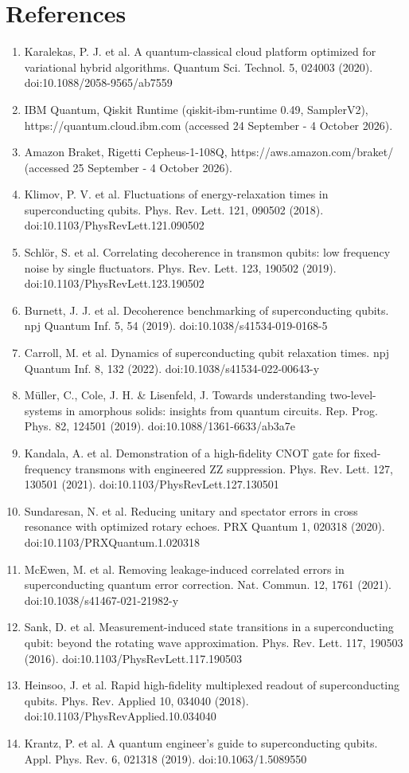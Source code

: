 \documentclass[11pt]{article}
\begin{document}
\section*{References}
\begin{enumerate}
\item Karalekas, P. J. et al. A quantum-classical cloud platform optimized for variational hybrid algorithms. Quantum Sci. Technol. 5, 024003 (2020). doi:10.1088/2058-9565/ab7559
\item IBM Quantum, Qiskit Runtime (qiskit-ibm-runtime 0.49, SamplerV2), https://quantum.cloud.ibm.com (accessed 24 September - 4 October 2026).
\item Amazon Braket, Rigetti Cepheus-1-108Q, https://aws.amazon.com/braket/ (accessed 25 September - 4 October 2026).
\item Klimov, P. V. et al. Fluctuations of energy-relaxation times in superconducting qubits. Phys. Rev. Lett. 121, 090502 (2018). doi:10.1103/PhysRevLett.121.090502
\item Schl\"or, S. et al. Correlating decoherence in transmon qubits: low frequency noise by single fluctuators. Phys. Rev. Lett. 123, 190502 (2019). doi:10.1103/PhysRevLett.123.190502
\item Burnett, J. J. et al. Decoherence benchmarking of superconducting qubits. npj Quantum Inf. 5, 54 (2019). doi:10.1038/s41534-019-0168-5
\item Carroll, M. et al. Dynamics of superconducting qubit relaxation times. npj Quantum Inf. 8, 132 (2022). doi:10.1038/s41534-022-00643-y
\item M\"uller, C., Cole, J. H. \& Lisenfeld, J. Towards understanding two-level-systems in amorphous solids: insights from quantum circuits. Rep. Prog. Phys. 82, 124501 (2019). doi:10.1088/1361-6633/ab3a7e
\item Kandala, A. et al. Demonstration of a high-fidelity CNOT gate for fixed-frequency transmons with engineered ZZ suppression. Phys. Rev. Lett. 127, 130501 (2021). doi:10.1103/PhysRevLett.127.130501
\item Sundaresan, N. et al. Reducing unitary and spectator errors in cross resonance with optimized rotary echoes. PRX Quantum 1, 020318 (2020). doi:10.1103/PRXQuantum.1.020318
\item McEwen, M. et al. Removing leakage-induced correlated errors in superconducting quantum error correction. Nat. Commun. 12, 1761 (2021). doi:10.1038/s41467-021-21982-y
\item Sank, D. et al. Measurement-induced state transitions in a superconducting qubit: beyond the rotating wave approximation. Phys. Rev. Lett. 117, 190503 (2016). doi:10.1103/PhysRevLett.117.190503
\item Heinsoo, J. et al. Rapid high-fidelity multiplexed readout of superconducting qubits. Phys. Rev. Applied 10, 034040 (2018). doi:10.1103/PhysRevApplied.10.034040
\item Krantz, P. et al. A quantum engineer's guide to superconducting qubits. Appl. Phys. Rev. 6, 021318 (2019). doi:10.1063/1.5089550
\end{enumerate}
\end{document}
